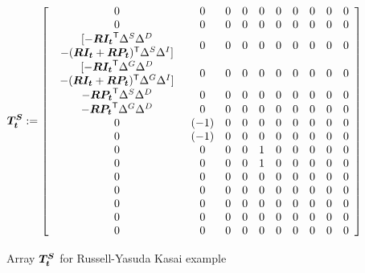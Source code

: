 \begin{figure}[ht]
\caption{Array $\mathbf{\boldsymbol{T^S_t}}$ for Russell-Yasuda Kasai example}
\label{RY:TSfig}
\small{
\[
\mathbf{\boldsymbol{T^S_t}} :=\left[
\begin{array}{cccccccccc}
0	& 0	& 0	& 0	& 0	& 0	& 0	& 0	& 0	& 0\\
0	& 0	& 0	& 0	& 0	& 0	& 0	& 0	& 0	& 0\\
\begin{array}{c}
	 [-\mathbf{\boldsymbol{RI_t}}^{\mbox{\scriptsize\sf T}} \Delta^S \Delta^D\\
	- (\mathbf{\boldsymbol{RI_t}} + \mathbf{\boldsymbol{RP_t}})^{\mbox{\scriptsize\sf T}} \Delta^S \Delta^I]
\end{array}
	& 0	& 0	& 0	& 0	& 0	& 0	& 0	& 0	& 0\\
\begin{array}{c}
	 [-\mathbf{\boldsymbol{RI_t}}^{\mbox{\scriptsize\sf T}} \Delta^G \Delta^D\\
	- (\mathbf{\boldsymbol{RI_t}} + \mathbf{\boldsymbol{RP_t}})^{\mbox{\scriptsize\sf T}} \Delta^G \Delta^I]
\end{array}
	& 0	& 0	& 0	& 0	& 0	& 0	& 0	& 0	& 0\\
-\mathbf{\boldsymbol{RP_t}}^{\mbox{\scriptsize\sf T}} \Delta^S \Delta^D	& 0	& 0	& 0	& 0	& 0	& 0	& 0	& 0	& 0\\
-\mathbf{\boldsymbol{RP_t}}^{\mbox{\scriptsize\sf T}} \Delta^G \Delta^D	& 0	& 0	& 0	& 0	& 0	& 0	& 0	& 0	& 0\\
0	& (-1)	& 0	& 0	& 0	& 0	& 0	& 0	& 0	& 0\\
0	& (-1)	& 0	& 0	& 0	& 0	& 0	& 0	& 0	& 0\\
0	& 0	& 0	& 0	& 1	& 0	& 0	& 0	& 0	& 0\\
0	& 0	& 0	& 0	& 1	& 0	& 0	& 0	& 0	& 0\\
0	& 0	& 0	& 0	& 0	& 0	& 0	& 0	& 0	& 0\\
0	& 0	& 0	& 0	& 0	& 0	& 0	& 0	& 0	& 0\\
0	& 0	& 0	& 0	& 0	& 0	& 0	& 0	& 0	& 0\\
0	& 0	& 0	& 0	& 0	& 0	& 0	& 0	& 0	& 0\\
0	& 0	& 0	& 0	& 0	& 0	& 0	& 0	& 0	& 0
\end{array}
\right]
\]
}
\end{figure}

